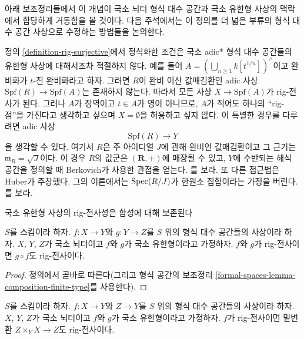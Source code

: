 \noindent
아래 보조정리들에서 이 개념이 국소 뇌터 형식 대수 공간과 국소 유한형
사상의 맥락에서 합당하게 거동함을 볼 것이다. 다음 주석에서는 이 정의를
더 넓은 부류의 형식 대수 공간 사상으로 수정하는 방법들을 논의한다.

\begin{remark}
\label{remark-rig-surjective-more-general}
정의 \ref{definition-rig-surjective}에서 정식화한 조건은 국소 adic*
형식 대수 공간들의 유한형 사상에 대해서조차 적절하지 않다.
예를 들어 $A = (\bigcup_{n \geq 1} k[t^{1/n}])^\wedge$이고 완비화가
$t$-진 완비화라고 하자. 그러면 $R$이 완비 이산 값매김환인 adic 사상
$\text{Spf}(R) \to \text{Spf}(A)$는 존재하지 않는다. 따라서 모든 사상
$X \to \text{Spf}(A)$가 rig-전사가 된다. 그러나 $A$가 정역이고
$t \in A$가 영이 아니므로, $A$가 적어도 하나의 ``rig-점''을 가진다고
생각하고 싶으며 $X = \emptyset$을 허용하고 싶지 않다. 이 특별한 경우를
다루려면 adic 사상
$$
\text{Spf}(R) \longrightarrow Y
$$
을 생각할 수 있다. 여기서 $R$은 주 아이디얼 $J$에 관해 완비인
값매김환이고 그 근기는 $\mathfrak m_R = \sqrt{J}$이다. 이 경우 $R$의
값군은 $(\mathbf{R}, +)$에 매장될 수 있고, $Y$에 수반되는 해석 공간을
정의할 때 Berkovich가 사용한 관점을 얻는다. \cite{Berkovich}를 보라.
또 다른 접근법은 Huber가 주창했다. 그의 이론에서는
$\mathop{\mathrm{Spec}}(R/J)$가 한원소 집합이라는 가정을 버린다.
\cite{Huber-continuous-valuations}를 보라.
\end{remark}

\begin{lemma}
\label{lemma-composition-rig-surjective}
\begin{slogan}
국소 유한형 사상의 rig-전사성은 합성에 대해 보존된다
\end{slogan}
$S$를 스킴이라 하자. $f : X \to Y$와 $g : Y \to Z$를 $S$ 위의
형식 대수 공간들의 사상이라 하자. $X$, $Y$, $Z$가 국소 뇌터이고
$f$와 $g$가 국소 유한형이라고 가정하자. $f$와 $g$가 rig-전사이면
$g \circ f$도 rig-전사이다.
\end{lemma}

\begin{proof}
정의에서 곧바로 따른다(그리고 형식 공간의 보조정리
\ref{formal-spaces-lemma-composition-finite-type}를 사용한다).
\end{proof}

\begin{lemma}
\label{lemma-base-change-rig-surjective}
$S$를 스킴이라 하자. $f : X \to Y$와 $Z \to Y$를 $S$ 위의
형식 대수 공간들의 사상이라 하자. $X$, $Y$, $Z$가 국소 뇌터이고
$f$와 $g$가 국소 유한형이라고 가정하자. $f$가 rig-전사이면
밑변환 $Z \times_Y X \to Z$도 rig-전사이다.
\end{lemma}

